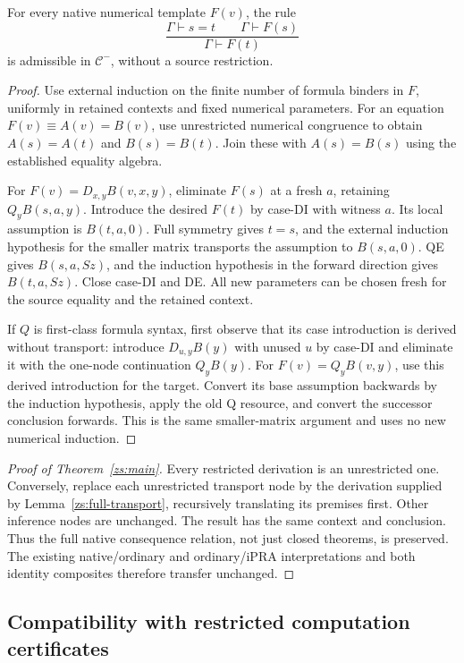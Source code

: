 \begin{lemma}
\label{zs:full-transport}
For every native numerical template $F(v)$, the rule
\[
 \frac{\Gamma\vdash s=t\qquad\Gamma\vdash F(s)}
      {\Gamma\vdash F(t)}
\]
is admissible in $\mathcal C^{-}$, without a source restriction.
\end{lemma}
\begin{proof}
Use external induction on the finite number of formula binders in
$F$, uniformly in retained contexts and fixed numerical parameters.
For an equation $F(v)\equiv A(v)=B(v)$, use unrestricted numerical
congruence to obtain $A(s)=A(t)$ and $B(s)=B(t)$. Join these with
$A(s)=B(s)$ using the established equality algebra.

For $F(v)=D_{x,y}B(v,x,y)$, eliminate $F(s)$ at a fresh $a$,
retaining $Q_yB(s,a,y)$. Introduce the desired $F(t)$ by case-DI
with witness $a$. Its local assumption is $B(t,a,0)$.
Full symmetry gives $t=s$, and the external induction hypothesis
for the smaller matrix transports the assumption to $B(s,a,0)$.
QE gives $B(s,a,Sz)$, and the induction hypothesis in the forward
direction gives $B(t,a,Sz)$. Close case-DI and DE. All new
parameters can be chosen fresh for the source equality and the
retained context.

If $Q$ is first-class formula syntax, first observe that its case
introduction is derived without transport: introduce
$D_{u,y}B(y)$ with unused $u$ by case-DI and eliminate it with the
one-node continuation $Q_yB(y)$. For $F(v)=Q_yB(v,y)$, use this
derived introduction for the target. Convert its base assumption
backwards by the induction hypothesis, apply the old Q resource,
and convert the successor conclusion forwards. This is the same
smaller-matrix argument and uses no new numerical induction.
\end{proof}

\begin{proof}[Proof of Theorem~\ref{zs:main}]
Every restricted derivation is an unrestricted one. Conversely,
replace each unrestricted transport node by the derivation supplied
by Lemma~\ref{zs:full-transport}, recursively translating its
premises first. Other inference nodes are unchanged. The result has
the same context and conclusion. Thus the full native consequence
relation, not just closed theorems, is preserved. The existing
native/ordinary and ordinary/iPRA interpretations and both identity
composites therefore transfer unchanged.
\end{proof}

\subsection{Compatibility with restricted computation certificates}
\label{zs:certificate-computation}

